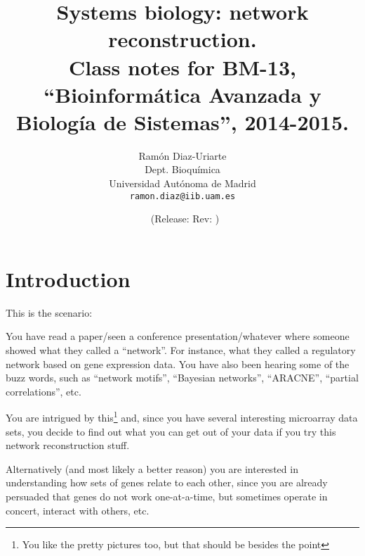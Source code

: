 


\title{Systems biology: network reconstruction. \\
\large Class notes for BM-13, ``Bioinform\'atica Avanzada y
Biolog\'ia de Sistemas'', 2014-2015.}


\author{Ram\'on Diaz-Uriarte\\
              Dept. Bioqu\'imica\\Universidad Aut\'onoma de Madrid \\ 
              \texttt{ramon.diaz@iib.uam.es} \\ 
               }


\date{\gitAuthorDate\ {\footnotesize (Release\gitRels: Rev:
    \gitAbbrevHash)}}



\makeindex



\maketitle
\vspace{-0.5cm}


\tableofcontents
\clearpage



\section{Introduction}

This is the scenario:


You have read a paper/seen a conference presentation/whatever where
someone showed what they called a ``network''. For instance, what they
called a regulatory network based on gene expression data. You have also
been hearing some of the buzz words, such as ``network motifs'',
``Bayesian networks'', ``ARACNE'', ``partial correlations'', etc.

You are intrigued by this\footnote{You like the pretty pictures too, but
  that should be besides the point} and, since you have several
interesting microarray data sets, you decide to find out what you can get
out of your data if you try this network reconstruction stuff.

Alternatively (and most likely a better reason) you are interested in
understanding how sets of genes relate to each other, since you are
already persuaded that genes do not work one-at-a-time, but sometimes
operate in concert, interact with others, etc.

